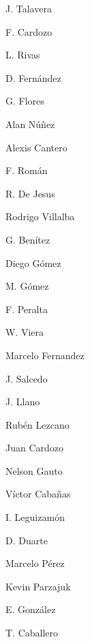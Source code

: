 J. Talavera

F. Cardozo

L. Rivas

D. Fernández

G. Flores

Alan Núñez

Alexis Cantero

F. Román

R. De Jesus

Rodrigo Villalba

G. Benítez

Diego Gómez

M. Gómez

F. Peralta

W. Viera

Marcelo Fernandez

J. Salcedo

J. Llano

Rubén Lezcano

Juan Cardozo

Nelson Gauto

Víctor Cabañas

I. Leguizamón

D. Duarte

Marcelo Pérez

Kevin Parzajuk

E. González

T. Caballero
